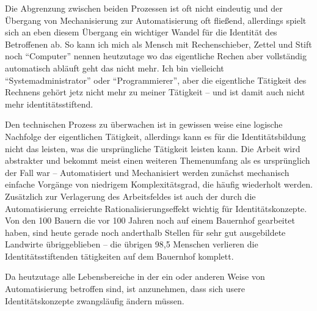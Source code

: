 Die Abgrenzung zwischen beiden Prozessen ist oft nicht eindeutig und der Übergang von Mechanisierung zur Automatisierung oft fließend, allerdings spielt sich an eben diesem Übergang ein wichtiger Wandel für die Identität des Betroffenen ab. So kann ich mich als Mensch mit Rechenschieber, Zettel und Stift noch \enquote{Computer} nennen heutzutage wo das eigentliche Rechen aber vollständig automatisch abläuft geht das nicht mehr. Ich bin vielleicht \enquote{Systemadministrator} oder \enquote{Programmierer}, aber die eigentliche Tätigkeit des Rechnens gehört jetz nicht mehr zu meiner Tätigkeit – und ist damit auch nicht mehr identitätsstiftend.

Den technischen Prozess zu überwachen ist in gewissen weise eine logische Nachfolge der eigentlichen Tätigkeit, allerdings kann es für die Identitätsbildung nicht das leisten, was die ursprüngliche Tätigkeit leisten kann.
Die Arbeit wird abstrakter und bekommt meist einen weiteren Themenumfang als es ursprünglich der Fall war \parencite{ulrich} – Automatisiert und Mechanisiert werden zunächst mechanisch einfache Vorgänge von niedrigem Komplexitätsgrad, die häufig wiederholt werden.
Zusätzlich zur Verlagerung des Arbeitsfeldes ist auch der durch die Automatisierung erreichte Rationalisierungseffekt wichtig für Identitätskonzepte.
Von den 100 Bauern die vor 100 Jahren noch auf einem Bauernhof gearbeitet haben, sind heute gerade noch anderthalb Stellen für sehr gut ausgebildete Landwirte übriggeblieben \parencite{arbeitsfrei} – die übrigen 98,5 Menschen verlieren die Identitätsstiftenden tätigkeiten auf dem Bauernhof komplett.

Da heutzutage alle Lebensbereiche in der ein oder anderen Weise von Automatisierung betroffen sind, ist anzunehmen, dass sich usere Identitätskonzepte zwangsläufig ändern müssen.

